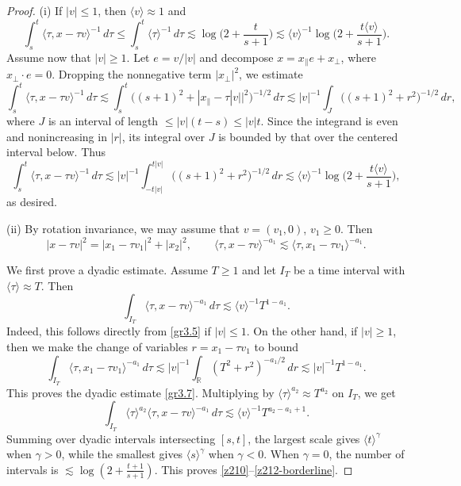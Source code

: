 \documentclass[reqno,11pt]{amsart}
\numberwithin{equation}{section}
\begin{document}
	\begin{proof} (i) If $|v|\le 1$, then $\langle v\rangle\approx 1$ and
		\[
		\int_s^t \langle \tau,x-\tau v\rangle^{-1}\,d\tau\le\int_s^t \langle \tau\rangle^{-1}\,d\tau\lesssim\log\Big(2+\frac{t}{s+1}\Big)\lesssim\langle v\rangle^{-1}\log\Big(2+\frac{t\langle v\rangle}{s+1}\Big).
		\]
		Assume now that $|v|\ge 1$. Let $e=v/|v|$ and
		decompose $x=x_\parallel e+x_\perp$, where
		$x_\perp\cdot e=0$. Dropping the nonnegative term $|x_\perp|^2$,
		we estimate
		\[
		\int_s^t \langle \tau,x-\tau v\rangle^{-1}\,d\tau\lesssim\int_s^t\big((s+1)^2+|x_\parallel-\tau|v||^2\big)^{-1/2}\,d\tau\lesssim |v|^{-1}\int_J \big((s+1)^2+r^2\big)^{-1/2}\,dr,
		\]
		where $J$ is an interval of length $\leq |v|(t-s)\leq |v|t$.
			Since the integrand is even and nonincreasing in $|r|$, its integral
			over $J$ is bounded by that over the centered interval below. Thus
		\[
		\int_s^t \langle \tau,x-\tau v\rangle^{-1}\,d\tau\lesssim |v|^{-1}\int_{-t|v|}^{t|v|}\big((s+1)^2+r^2\big)^{-1/2}\,dr\lesssim\langle v\rangle^{-1}\log\Big(2+\frac{t\langle v\rangle}{s+1}\Big),
		\]
		as desired.
		
		
		(ii) By rotation invariance, we may assume that $v=(v_1,0)$, $v_1\geq 0$. Then
		\begin{equation}\label{gr3.5}
			|x-\tau v|^2=|x_1-\tau v_1|^2+|x_2|^2,\qquad 
			\langle\tau,x-\tau v\rangle^{-a_1}\lesssim\langle \tau,x_1-\tau v_1\rangle^{-a_1}.
		\end{equation}
		
		We first prove a dyadic estimate. Assume $T\geq 1$ and let $I_T$ be a time interval with
		$\langle\tau\rangle\approx T$. Then
		\begin{equation}\label{gr3.7}
			\int_{I_T}\langle\tau,x-\tau v\rangle^{-a_1}\,d\tau\lesssim\langle v\rangle^{-1}T^{1-a_1}.
		\end{equation}
		Indeed, this follows directly from \eqref{gr3.5} if $|v|\le1$. On the other hand, if $|v|\ge1$, then we make the change of variables $r=x_1-\tau v_1$ to bound
		\[
		\int_{I_T}\langle \tau,x_1-\tau v_1\rangle^{-a_1}\,d\tau\lesssim|v|^{-1}\int_{\mathbb R}(T^2+r^2)^{-a_1/2}\,dr\lesssim|v|^{-1}T^{1-a_1}.
		\]
		This proves the dyadic estimate \eqref{gr3.7}. Multiplying by $\langle\tau\rangle^{a_2}\approx T^{a_2}$ on $I_T$, we get
		\[\int_{I_T}\langle\tau\rangle^{a_2}\langle\tau,x-\tau v\rangle^{-a_1}\,d\tau\lesssim\langle v\rangle^{-1}T^{a_2-a_1+1}.
		\]
		Summing over dyadic intervals intersecting $[s,t]$, the largest scale
			gives $\langle t\rangle^\gamma$ when $\gamma>0$, while the smallest
			gives $\langle s\rangle^\gamma$ when $\gamma<0$.
			When $\gamma=0$, the number of intervals is
			$\lesssim\log\!\left(2+\frac{t+1}{s+1}\right)$.
			This proves \eqref{z210}--\eqref{z212-borderline}.
	\end{proof}
	
\end{document}
